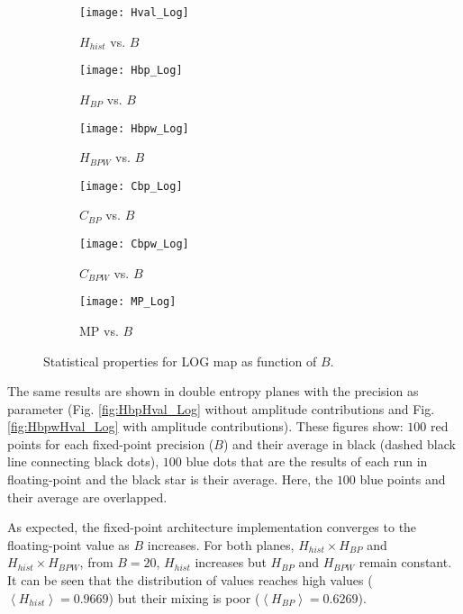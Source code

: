 \begin{figure}[H]
	\centering
	\begin{subfigure}[b]{0.49\textwidth}
		\texttt{[image: Hval\_Log]}
		\caption{$H_{hist}$ vs. $B$}
		\label{fig:Hval_Log}
	\end{subfigure}
	\begin{subfigure}[b]{0.49\textwidth}
		\texttt{[image: Hbp\_Log]}
		\caption{$H_{BP}$ vs. $B$}
		\label{fig:Hbp_Log}
	\end{subfigure}
	\begin{subfigure}[b]{0.49\textwidth}
		\texttt{[image: Hbpw\_Log]}
		\caption{$H_{BPW}$ vs. $B$}
		\label{fig:Hbpw_Log}
	\end{subfigure}
	\begin{subfigure}[b]{0.49\textwidth}
		\texttt{[image: Cbp\_Log]}
		\caption{$C_{BP}$ vs. $B$}
		\label{fig:Cbp_Log}
	\end{subfigure}
	\begin{subfigure}[b]{0.49\textwidth}
		\texttt{[image: Cbpw\_Log]}
		\caption{$C_{BPW}$ vs. $B$}
		\label{fig:Cbpw_Log}
	\end{subfigure}
	\begin{subfigure}[b]{0.49\textwidth}
		\texttt{[image: MP\_Log]}
		\caption{MP vs. $B$}
		\label{fig:MP_Log}
	\end{subfigure}
	\caption{Statistical properties for LOG map as function of $B$.}
	\label{fig:LOG_QuantiB}
\end{figure}

The same results are shown in double entropy planes with the precision as parameter (Fig. \ref{fig:HbpHval_Log} without amplitude contributions and Fig. \ref{fig:HbpwHval_Log} with amplitude contributions).
These figures show: $100$ red points for each fixed-point precision ($B$) and their average in black (dashed black line connecting black dots), $100$ blue dots that are the results of each run in floating-point and the black star is their average.
Here, the $100$ blue points and their average are overlapped.

As expected, the fixed-point architecture implementation converges to the floating-point value as $B$ increases.
For both planes, $H_{hist} \times H_{BP}$ and $H_{hist} \times H_{BPW}$, from $B=20$, $H_{hist}$ increases but $H_{BP}$ and $H_{BPW}$ remain constant.
It can be seen that the distribution of values reaches high values ($\left\langle H_{hist}\right\rangle =0.9669$) but their mixing is poor ($\left\langle H_{BP}\right\rangle =0.6269$).

